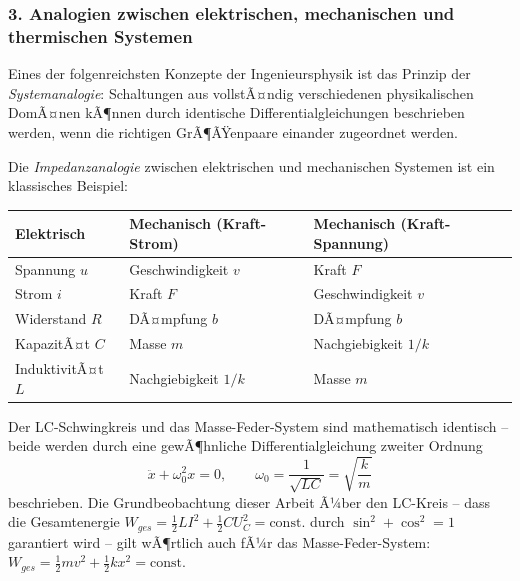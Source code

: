 ﻿\documentclass[12pt, a4paper]{article}
\begin{document}
	\subsubsection*{3. \quad Analogien zwischen elektrischen, mechanischen und thermischen Systemen}

	Eines der folgenreichsten Konzepte der Ingenieursphysik ist das Prinzip der \textit{Systemanalogie}: Schaltungen aus vollstÃ¤ndig verschiedenen physikalischen DomÃ¤nen kÃ¶nnen durch identische Differentialgleichungen beschrieben werden, wenn die richtigen GrÃ¶ÃŸenpaare einander zugeordnet werden.

	Die \textit{Impedanzanalogie} zwischen elektrischen und mechanischen Systemen ist ein klassisches Beispiel:
	\begin{center}
		\begin{tabular}{lll}
			\toprule
			\textbf{Elektrisch} & \textbf{Mechanisch (Kraft-Strom)} & \textbf{Mechanisch (Kraft-Spannung)} \\
			\midrule
			Spannung $u$ & Geschwindigkeit $v$ & Kraft $F$ \\
			Strom $i$ & Kraft $F$ & Geschwindigkeit $v$ \\
			Widerstand $R$ & DÃ¤mpfung $b$ & DÃ¤mpfung $b$ \\
			KapazitÃ¤t $C$ & Masse $m$ & Nachgiebigkeit $1/k$ \\
			InduktivitÃ¤t $L$ & Nachgiebigkeit $1/k$ & Masse $m$ \\
			\bottomrule
		\end{tabular}
	\end{center}

	Der LC-Schwingkreis und das Masse-Feder-System sind mathematisch identisch -- beide werden durch eine gewÃ¶hnliche Differentialgleichung zweiter Ordnung
	\begin{equation}
		\ddot{x} + \omega_0^2 x = 0, \qquad \omega_0 = \frac{1}{\sqrt{LC}} = \sqrt{\frac{k}{m}}
	\end{equation}
	beschrieben. Die Grundbeobachtung dieser Arbeit Ã¼ber den LC-Kreis -- dass die Gesamtenergie $W_{ges} = \frac{1}{2}LI^2 + \frac{1}{2}CU_C^2 = \mathrm{const.}$ durch $\sin^2 + \cos^2 = 1$ garantiert wird -- gilt wÃ¶rtlich auch fÃ¼r das Masse-Feder-System: $W_{ges} = \frac{1}{2}mv^2 + \frac{1}{2}kx^2 = \mathrm{const.}$
\end{document}
